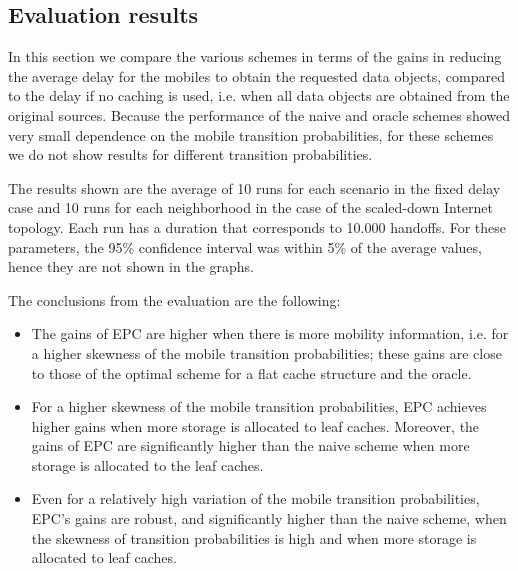 \documentclass[conference]{IEEEtran}
\newcommand{\mynote}[1]{{{\medskip
\footnotesize \em \noindent Note: #1}}\medskip}
\newcommand{\mynotex}[1]{}
\renewcommand{\mynote}[1]{}
\newcommand{\M}{\mbox{\tiny M}}
\newcommand{\Leaf}{\mbox{\tiny L}}
\newcommand{\R}{\mbox{\tiny R}}
\begin{document}
\mynote{TODO:
\begin{itemize}
\item XV: actual value for X.X.
\end{itemize}
}

\mynotex{TODO:
\begin{itemize}
\item Possibly add reference about number of hops, to motivate the ratios $D_{\R}/D_{\Leaf}, D_{\M}/D_{\Leaf}$
\end{itemize}
}

\vspace{-0.05in}
\subsection{Evaluation results}
\vspace{-0.05in}

In this section we compare the various schemes in terms of the gains in reducing the average delay for the mobiles to obtain the requested data objects, compared to the delay if no caching is used, i.e. when all data objects are obtained from the original sources.
Because the performance of the naive and oracle schemes showed very small dependence on the mobile transition probabilities, for these schemes we do not show results for different transition probabilities.

The results shown  are the average of 10 runs for each scenario in the fixed delay case and 10 runs for each neighborhood in the case of the scaled-down Internet topology. Each run has a duration that corresponds to 10.000 handoffs. For these parameters, the 95\% confidence interval was within 5\% of the average values,  hence they are not shown in  the graphs.

\mynote{XV: Check stand. dev. for variable delay.}

The  conclusions from the evaluation are the following:
\begin{itemize}
\item The gains of EPC  are higher when there is more mobility information, i.e. for a higher skewness of the mobile transition probabilities; these gains are close to those of the optimal scheme for a flat cache structure and the oracle.
\item For a higher skewness of the mobile transition probabilities,  EPC achieves higher gains when  more storage is allocated to  leaf caches. Moreover, the gains of  EPC are significantly higher than the naive scheme when more storage is allocated to the leaf caches.
\item Even for a relatively high variation of the mobile transition probabilities, EPC's gains are robust, and  significantly higher  than the naive scheme, when the  skewness of transition probabilities is high and when more storage is allocated to leaf caches.
\end{itemize}
\end{document}
